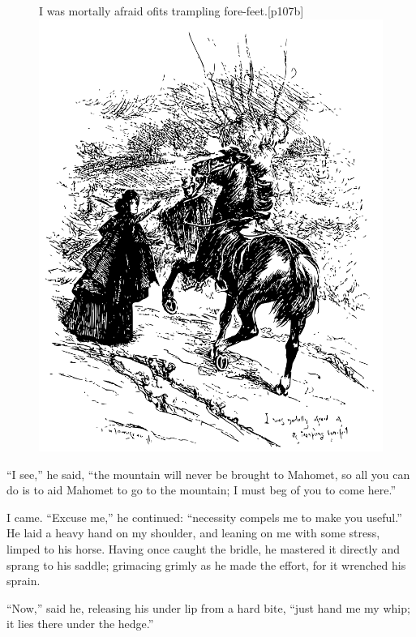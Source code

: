 \begin{figure}
	\begin{sidecaption}{I was mortally afraid of\linebreak its trampling fore-feet.}[p107b]
		\centering
		\includegraphics[width=\linewidth]{images/p107b.pdf}
	\end{sidecaption}
\end{figure}

\enquote{I see,} he said, \enquote{the mountain will never be brought to
	Mahomet, so all you can do is to aid Mahomet to go to the mountain; I
	must beg of you to come here.}

I came. \enquote{Excuse me,} he continued: \enquote{necessity compels
	me to make you useful.} He laid a heavy hand on my shoulder, and
leaning on me with some stress, limped to his horse. Having once caught
the bridle, he mastered it directly and sprang to his saddle; grimacing
grimly as he made the effort, for it wrenched his sprain.

\enquote{Now,} said he, releasing his under lip from a hard bite,
\enquote{just hand me my whip; it lies there under the hedge.}

